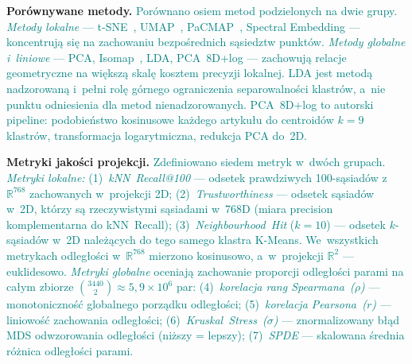 \documentclass[a4paper,11pt,twocolumn]{article}
\newcommand{\hlme}[1]{\textcolor{teal}{#1}}
\begin{document}
\textbf{Porównywane metody.}
\hlme{Porównano osiem metod podzielonych na dwie grupy.
\emph{Metody lokalne} --- t-SNE~\cite{maaten2008}, UMAP~\cite{mcinnes2018},
PaCMAP~\cite{wang2021}, Spectral Embedding --- koncentrują się na
zachowaniu bezpośrednich sąsiedztw punktów.
\emph{Metody globalne i~liniowe} --- PCA, Isomap~\cite{tenenbaum2000},
LDA, PCA~8D+log --- zachowują relacje geometryczne na większą skalę
kosztem precyzji lokalnej.
LDA jest metodą nadzorowaną i~pełni rolę górnego ograniczenia
separowalności klastrów, a~nie punktu odniesienia dla metod nienadzorowanych.
PCA~8D+log to autorski pipeline: podobieństwo kosinusowe każdego artykułu
do centroidów $k=9$ klastrów, transformacja logarytmiczna, redukcja PCA do~2D.}

\textbf{Metryki jakości projekcji.}
\hlme{Zdefiniowano siedem metryk w~dwóch grupach.
\emph{Metryki lokalne:}
(1)~\emph{kNN~Recall@100} --- odsetek prawdziwych 100-sąsiadów
z~$\mathbb{R}^{768}$ zachowanych w~projekcji 2D;
(2)~\emph{Trustworthiness} --- odsetek sąsiadów w~2D, którzy są
rzeczywistymi sąsiadami w~768D (miara precision komplementarna do kNN~Recall);
(3)~\emph{Neighbourhood~Hit} ($k=10$) --- odsetek $k$-sąsiadów w~2D
należących do tego samego klastra K-Means.
We~wszystkich metrykach odległości w~$\mathbb{R}^{768}$ mierzono
kosinusowo, a~w~projekcji $\mathbb{R}^2$ --- euklidesowo.
\emph{Metryki globalne} oceniają zachowanie proporcji odległości parami
na całym zbiorze $\binom{3440}{2} \approx 5{,}9 \times 10^6$ par:
(4)~\emph{korelacja rang Spearmana~($\rho$)} --- monotoniczność
globalnego porządku odległości;
(5)~\emph{korelacja Pearsona~($r$)} --- liniowość zachowania odległości;
(6)~\emph{Kruskal~Stress~($\sigma$)} --- znormalizowany błąd MDS
odwzorowania odległości (niższy = lepszy);
(7)~\emph{SPDE} --- skalowana średnia różnica odległości parami.}
\end{document}
